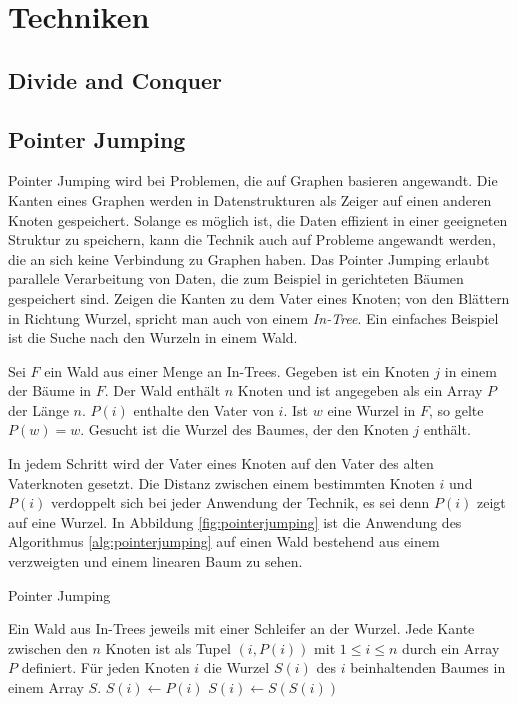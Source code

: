\section{Techniken}

\subsection{Divide and Conquer}

\subsection{Pointer Jumping}
Pointer Jumping wird bei Problemen, die auf Graphen basieren angewandt.
Die Kanten eines Graphen werden in Datenstrukturen als Zeiger auf einen anderen
Knoten gespeichert.
Solange es möglich ist, die Daten effizient in einer geeigneten Struktur zu
speichern, kann die Technik auch auf Probleme angewandt werden, die an sich
keine Verbindung zu Graphen haben.
Das Pointer Jumping erlaubt parallele Verarbeitung von Daten, die zum Beispiel
in gerichteten Bäumen gespeichert sind.
Zeigen die Kanten zu dem Vater eines Knoten; von den Blättern in Richtung
Wurzel, spricht man auch von einem \emph{In-Tree}.
Ein einfaches Beispiel ist die Suche nach den Wurzeln in einem Wald.
%
\begin{problem}
    Sei $F$ ein Wald aus einer Menge an In-Trees.
    Gegeben ist ein Knoten $j$ in einem der Bäume in $F$.
    Der Wald enthält $n$ Knoten und ist angegeben als ein Array $P$ der Länge
    $n$.
    $P(i)$ enthalte den Vater von $i$.
    Ist $w$ eine Wurzel in $F$, so gelte $P(w) = w$.
    Gesucht ist die Wurzel des Baumes, der den Knoten $j$ enthält.
\end{problem}
%
In jedem Schritt wird der Vater eines Knoten auf den Vater des alten
Vaterknoten gesetzt.
Die Distanz zwischen einem bestimmten Knoten $i$ und $P(i)$ verdoppelt sich bei
jeder Anwendung der Technik, es sei denn $P(i)$ zeigt auf eine Wurzel.
In Abbildung \ref{fig:pointerjumping} ist die Anwendung des Algorithmus
\ref{alg:pointerjumping} auf einen Wald bestehend aus einem verzweigten und
einem linearen Baum zu sehen.
%
\begin{algorithm}
    \caption{Pointer Jumping \cite[S.52]{jaja}}
    \label{alg:pointerjumping}
    \begin{algorithmic}[1]
    \Require Ein Wald aus In-Trees jeweils mit einer Schleifer an der Wurzel.
        Jede Kante zwischen den $n$ Knoten ist als Tupel $(i, P(i))$ mit
        $1 \leq i \leq n$ durch ein Array $P$ definiert.
    \Ensure Für jeden Knoten $i$ die Wurzel $S(i)$ des $i$ beinhaltenden
        Baumes in einem Array $S$.
        \State $S(i) \gets P(i)$
            \State $S(i) \gets S(S(i))$
        \EndWhile
    \EndParDo
    \end{algorithmic}
\end{algorithm}
